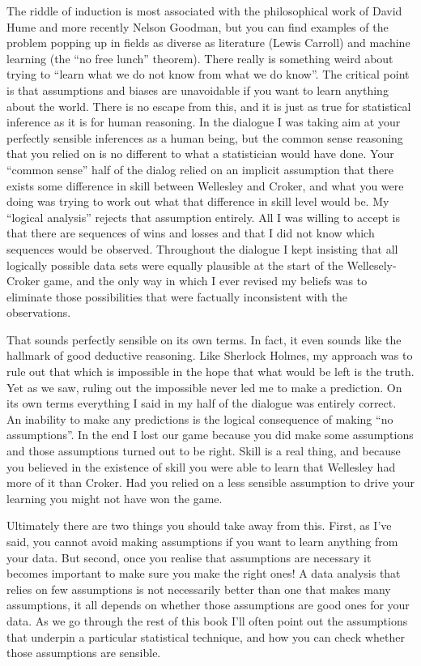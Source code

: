 \documentclass[
  letterpaper,
]{book}
\begin{document}
The riddle of induction is most associated with the philosophical work
of David Hume and more recently Nelson Goodman, but you can find
examples of the problem popping up in fields as diverse as literature
(Lewis Carroll) and machine learning (the ``no free lunch'' theorem).
There really is something weird about trying to ``learn what we do not
know from what we do know''. The critical point is that assumptions and
biases are unavoidable if you want to learn anything about the world.
There is no escape from this, and it is just as true for statistical
inference as it is for human reasoning. In the dialogue I was taking aim
at your perfectly sensible inferences as a human being, but the common
sense reasoning that you relied on is no different to what a
statistician would have done. Your ``common sense'' half of the dialog
relied on an implicit assumption that there exists some difference in
skill between Wellesley and Croker, and what you were doing was trying
to work out what that difference in skill level would be. My ``logical
analysis'' rejects that assumption entirely. All I was willing to accept
is that there are sequences of wins and losses and that I did not know
which sequences would be observed. Throughout the dialogue I kept
insisting that all logically possible data sets were equally plausible
at the start of the Wellesely-Croker game, and the only way in which I
ever revised my beliefs was to eliminate those possibilities that were
factually inconsistent with the observations.

That sounds perfectly sensible on its own terms. In fact, it even sounds
like the hallmark of good deductive reasoning. Like Sherlock Holmes, my
approach was to rule out that which is impossible in the hope that what
would be left is the truth. Yet as we saw, ruling out the impossible
never led me to make a prediction. On its own terms everything I said in
my half of the dialogue was entirely correct. An inability to make any
predictions is the logical consequence of making ``no assumptions''. In
the end I lost our game because you did make some assumptions and those
assumptions turned out to be right. Skill is a real thing, and because
you believed in the existence of skill you were able to learn that
Wellesley had more of it than Croker. Had you relied on a less sensible
assumption to drive your learning you might not have won the game.

Ultimately there are two things you should take away from this. First,
as I've said, you cannot avoid making assumptions if you want to learn
anything from your data. But second, once you realise that assumptions
are necessary it becomes important to make sure you make the right ones!
A data analysis that relies on few assumptions is not necessarily better
than one that makes many assumptions, it all depends on whether those
assumptions are good ones for your data. As we go through the rest of
this book I'll often point out the assumptions that underpin a
particular statistical technique, and how you can check whether those
assumptions are sensible.
\end{document}
